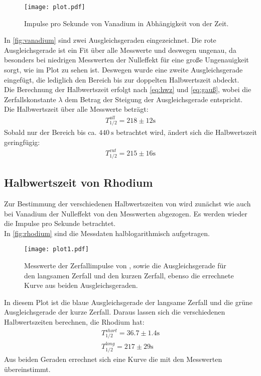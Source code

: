 \begin{figure}[htbp]
    \centering
    \texttt{[image: plot.pdf]}
    \caption{Impulse pro Sekunde von Vanadium in Abhängigkeit von der Zeit.}
    \label{fig:vanadium}
\end{figure}
\newpage
In \autoref{fig:vanadium} sind zwei Ausgleichsgeraden eingezeichnet.
Die rote Ausgleichsgerade ist ein Fit über alle Messwerte und deswegen ungenau, da besonders bei niedrigen Messwerten der Nulleffekt für eine große Ungenauigkeit sorgt, wie im Plot zu sehen ist.
Deswegen wurde eine zweite Ausgleichsgerade eingefügt, die lediglich den Bereich bis zur doppelten Halbwertszeit abdeckt.\\
Die Berechnung der Halbwertszeit erfolgt nach \autoref{eq:hwz} und \autoref{eq:gauß}, wobei die Zerfallskonstante $\lambda$ dem Betrag der Steigung der Ausgleichsgerade entspricht.\\
Die Halbwertszeit über alle Messwerte beträgt:
\begin{align*}
    T^{all}_{1/2} = 218\pm 12\si{\second}
\end{align*}
Sobald nur der Bereich bis ca. $\SI{440}{\second}$ betrachtet wird, ändert sich die Halbwertszeit geringfügig:
\begin{align*}
    T^{cut}_{1/2} = 215\pm 16\si{\second}
\end{align*}

\subsection{Halbwertszeit von Rhodium}
Zur Bestimmung der verschiedenen Halbwertszeiten von  wird zunächst wie auch bei Vanadium der Nulleffekt von den Messwerten abgezogen.
Es werden wieder die Impulse pro Sekunde betrachtet.\\
In \autoref{fig:rhodium} sind die Messdaten halblogarithmisch aufgetragen.

\begin{figure}[htbp]
    \centering
    \texttt{[image: plot1.pdf]}
    \caption{Messwerte der Zerfallimpulse von , sowie die Ausgleichsgerade für den langsamen Zerfall und den kurzen Zerfall, ebenso die errechnete Kurve aus beiden Ausgleichsgeraden.}
    \label{fig:rhodium}
\end{figure}

In diesem Plot ist die blaue Ausgleichsgerade der langsame Zerfall und die grüne Ausgleichsgerade der kurze Zerfall.
Daraus lassen sich die verschiedenen Halbwertszeiten berechnen, die Rhodium hat:
\begin{align*}
    T^{short}_{1/2} = 36.7\pm 1.4\si{\second}\\
    T^{long}_{1/2} = 217\pm 29\si{\second}
\end{align*}
Aus beiden Geraden errechnet sich eine Kurve die mit den Messwerten übereinstimmt.